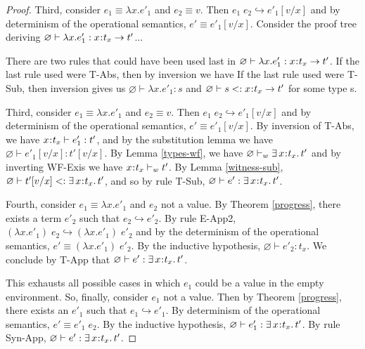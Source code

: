 \documentclass[11pt]{article}
\newcommand{\bind}{\hspace{0.05em}{:}\hspace{0.05em}} %
\newcommand{\step}{\hookrightarrow}
\newcommand{\existype}[3]{\exists\, #1\bind #2.\, #3}
\newcommand{\functype}[3]{#1\bind #2 \rightarrow #3}
\begin{document}
\begin{proof}
Third, consider $e_1 \equiv \lambda x.e'_1$ and $e_2 \equiv v$. Then $e_1\; e_2 \step e'_1[v/x]$ and by determinism of the operational semantics, $e' \equiv e'_1[v/x]$. Consider the proof tree deriving $\varnothing \vdash \lambda x.e'_1 : \functype{x}{t_x}{t'}$...


There are two rules that could have been used last in $\varnothing \vdash \lambda x.e'_1 : \functype{x}{t_x}{t'}$. If the last rule used were {\sc T-Abs}, then by inversion we have %
If the last rule used were {\sc T-Sub}, then inversion gives us $\varnothing \vdash \lambda x.e'_1 : s$ and $\varnothing \vdash s <: \functype{x}{t_x}{t'}$ for some type s. 




Third, consider $e_1 \equiv \lambda x.e'_1$ and $e_2 \equiv v$. Then $e_1\; e_2 \step e'_1[v/x]$ and by determinism of the operational semantics, $e' \equiv e'_1[v/x]$. By inversion of {\sc T-Abs}, we have $x\bind t_x \vdash e'_1 : t'$, and by the substitution lemma we have $\varnothing \vdash e'_1[v/x] : t'[v/x]$. By Lemma \ref{types-wf}, we have $\varnothing \vdash_w \existype{x}{t_x}{t'}$ and by inverting {\sc WF-Exis} we have $x\bind t_x \vdash_w t'$. By Lemma \ref{witness-sub}, $\varnothing \vdash t'[v/x] <: \existype{x}{t_x}{t'}$, and so by rule {\sc T-Sub}, $\varnothing \vdash e' : \existype{x}{t_x}{t'}$.

Fourth, consider $e_1 \equiv \lambda x.e'_1$ and $e_2$ not a value. By Theorem \ref{progress}, there exists a term $e'_2$ such that $e_2 \step e'_2$. By rule {\sc E-App2}, $(\lambda x.e'_1)\; e_2 \step (\lambda x.e'_1)\; e'_2$ and by the determinism of the operational semantics, $e' \equiv (\lambda x.e'_1)\; e'_2$.
By the inductive hypothesis, $\varnothing \vdash e'_2 : t_x$. We conclude by {\sc T-App} that $\varnothing \vdash e' : \existype{x}{t_x}{t'}$.

This exhausts all possible cases in which $e_1$ could be a value in the empty environment. So, finally, consider $e_1$ not a value.
Then by Theorem \ref{progress}, there exists an $e'_1$ such that $e_1 \hookrightarrow e'_1$. By determinism of the operational semantics, $e' \equiv e'_1\; e_2$. By the inductive hypothesis,
$\varnothing \vdash e'_1 : \existype{x}{t_x}{t'}$. By rule {\sc Syn-App}, $\varnothing \vdash e' : \existype{x}{t_x}{t'}$.


\end{proof}
\end{document}
